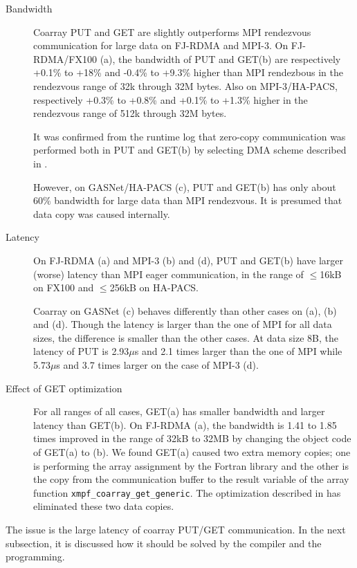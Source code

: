 \begin{description}

\item [Bandwidth]
Coarray PUT and GET are slightly outperforms MPI rendezvous communication for large data 
on FJ-RDMA and MPI-3.
On FJ-RDMA/FX100 (a), the bandwidth of PUT and GET(b) are respectively 
+0.1\% to +18\% and -0.4\% to +9.3\% higher than MPI rendezbous in the 
rendezvous range of 32k through 32M bytes.
Also on MPI-3/HA-PACS, respectively +0.3\% to +0.8\% and 
+0.1\% to +1.3\% higher in the rendezvous range of 512k through 32M bytes.

It was confirmed from the runtime log that zero-copy communication was performed
both in PUT and GET(b) by selecting DMA scheme described in .

However, on GASNet/HA-PACS (c), PUT and GET(b) has only about 60\% bandwidth for large data
than MPI rendezvous.
It is presumed that data copy was caused internally.

\item [Latency]
On FJ-RDMA (a) and MPI-3 (b) and (d), PUT and GET(b) have larger (worse) latency than 
MPI eager communication, in the range of $\leq$16kB on FX100 and $\leq$256kB on HA-PACS.

Coarray on GASNet (c) behaves differently than other cases on (a), (b) and (d).
Though the latency is larger than the one of MPI for all data sizes, the difference
is smaller than the other cases. At data size 8B, the latency of PUT is 2.93$\mu$s
and 2.1 times larger than the one of MPI 
while 5.73$\mu$s and 3.7 times larger on the case of MPI-3 (d).

\item [Effect of GET optimization]
For all ranges of all cases, GET(a) has smaller bandwidth and larger latency than GET(b).
On FJ-RDMA (a), the bandwidth is 1.41 to 1.85 times improved in the range of 32kB to 32MB
by changing the object code of GET(a) to (b).
We found GET(a) caused two extra memory copies; one is performing the array assignment 
by the Fortran library and the other is the copy from the communication buffer 
to the result variable of the array function {\tt xmpf\_coarray\_get\_generic}. 
The optimization described in  has eliminated these two data copies.

\end{description}

The issue is the large latency of coarray PUT/GET communication.
In the next subsection, it is discussed how it should be solved 
by the compiler and the programming.


